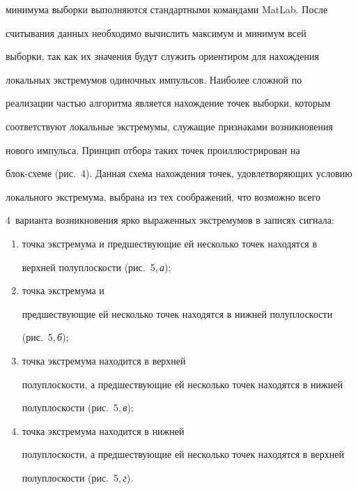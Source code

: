 минимума выборки выполняются стандартными командами MatLab. После 


считывания данных необходимо вычислить максимум и минимум всей 


выборки, так как их значения будут служить ориентиром для нахождения 


локальных экстремумов одиночных импульсов. Наиболее сложной по 


реализации частью алгоритма является нахождение точек выборки, которым 


соответствуют локальные экстремумы, служащие признаками возникновения 


нового импульса. Принцип отбора таких точек проиллюстрирован на 


блок-схеме (рис.~4). Данная схема на\-хож\-де\-ния точек, удовлетворяющих условию 


локального экстремума, выбрана из тех соображений, что возможно всего 


4~варианта возникновения ярко выраженных экстремумов в записях сигнала: 


\begin{enumerate}[(1)]


\item точка экстремума и предшествующие ей несколько точек находятся в 


верхней полуплоскости (рис.~5,\,\textit{а}); 


\item точка экстремума и 


предшествующие ей несколько точек находятся в нижней полуплоскости 


(рис.~5,\,\textit{б}); 


\item точка экстремума находится в верхней 


полуплоскости, а предшествующие ей несколько точек находятся в нижней 


полуплоскости (рис.~5,\,\textit{в}); 


\item точка экстремума находится в нижней 


полуплоскости, а предшествующие ей несколько точек находятся в верхней 


полуплоскости (рис.~5,\,\textit{г}).


\end{enumerate}





